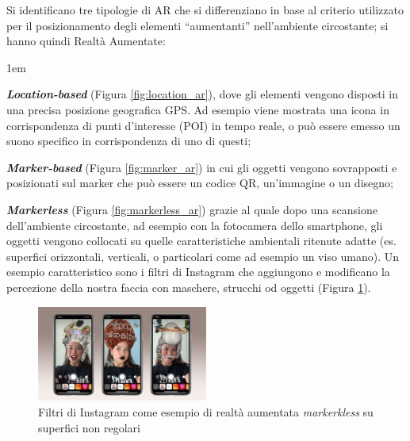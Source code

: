 Si identificano tre tipologie di AR che si differenziano in base al criterio utilizzato per il posizionamento degli elementi \enquote{aumentanti} nell'ambiente circostante; si hanno quindi Realtà Aumentate:

\begin{description}
    \itemsep1em
    \item \textbf{\textit{Location-based}} (Figura \ref{fig:location_ar}), dove gli elementi vengono disposti in una precisa posizione geografica GPS. Ad esempio viene mostrata una icona in corrispondenza di punti d'interesse (POI) in tempo reale, o può essere emesso un suono specifico in corrispondenza di uno di questi;
    \item \textbf{\textit{Marker-based}} (Figura \ref{fig:marker_ar}) in cui gli oggetti vengono sovrapposti e posizionati sul marker che può essere un codice QR, un'immagine o un disegno;
    \item \textbf{\textit{Markerless}} (Figura \ref{fig:markerless_ar}) grazie al quale dopo una scansione dell'ambiente circostante, ad esempio con la fotocamera dello smartphone, gli oggetti vengono collocati su quelle caratteristiche ambientali ritenute adatte (es. superfici orizzontali, verticali, o particolari come ad esempio un viso umano). Un esempio caratteristico sono i filtri di Instagram che aggiungono e modificano la percezione della nostra faccia con maschere, strucchi od oggetti (Figura \ref{fig:instaFilter}).
    \begin{figure} [h]
        \centering
        \includegraphics[width=0.5\textwidth]{img/instaFilter.jpeg}
        \caption{Filtri di Instagram come esempio di realtà aumentata \textit{markerkless} su superfici non regolari}
        \label{fig:instaFilter}
    \end{figure}
\end{description}

